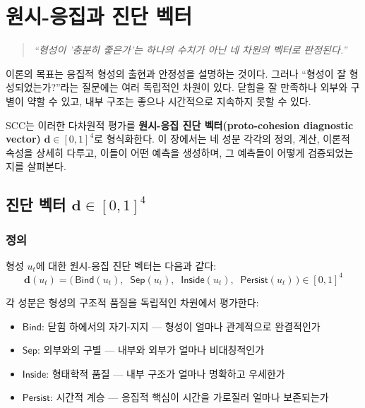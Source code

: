 
\chapter{원시-응집과 진단 벡터}
\label{ch:diagnostic-vector}

\begin{quote}
\textit{``형성이 '충분히 좋은가'는 하나의 수치가 아닌 네 차원의 벡터로 판정된다.''}
\end{quote}

\vspace{0.5em}
이론의 목표는 응집적 형성의 출현과 안정성을 설명하는 것이다. 그러나 ``형성이 잘 형성되었는가?''라는 질문에는 여러 독립적인 차원이 있다. 닫힘을 잘 만족하나 외부와 구별이 약할 수 있고, 내부 구조는 좋으나 시간적으로 지속하지 못할 수 있다.

SCC는 이러한 다차원적 평가를 \textbf{원시-응집 진단 벡터(proto-cohesion diagnostic vector)} $\mathbf{d} \in [0,1]^4$로 형식화한다. 이 장에서는 네 성분 각각의 정의, 계산, 이론적 속성을 상세히 다루고, 이들이 어떤 예측을 생성하며, 그 예측들이 어떻게 검증되었는지를 살펴본다.


\section{진단 벡터 $\mathbf{d} \in [0,1]^4$}
\label{sec:diagnostic-vector}

\subsection{정의}

형성 $u_t$에 대한 원시-응집 진단 벡터는 다음과 같다:
\begin{equation}
    \mathbf{d}(u_t) = \Big(\, \mathsf{Bind}(u_t),\;\; \mathsf{Sep}(u_t),\;\; \mathsf{Inside}(u_t),\;\; \mathsf{Persist}(u_t) \,\Big) \in [0,1]^4
    \label{eq:diagnostic-vector}
\end{equation}

각 성분은 형성의 구조적 품질을 독립적인 차원에서 평가한다:
\begin{itemize}
    \item $\mathsf{Bind}$: 닫힘 하에서의 자기-지지 --- 형성이 얼마나 관계적으로 완결적인가
    \item $\mathsf{Sep}$: 외부와의 구별 --- 내부와 외부가 얼마나 비대칭적인가
    \item $\mathsf{Inside}$: 형태학적 품질 --- 내부 구조가 얼마나 명확하고 우세한가
    \item $\mathsf{Persist}$: 시간적 계승 --- 응집적 핵심이 시간을 가로질러 얼마나 보존되는가
\end{itemize}

